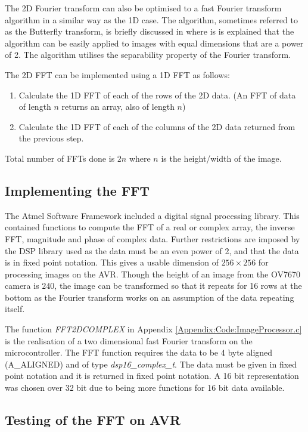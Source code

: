 The 2D Fourier transform can also be optimised to a fast Fourier transform algorithm in a similar way as the 1D case. The algorithm, sometimes referred to as the Butterfly transform, is briefly discussed in \cite{nixon2012feature} where is is explained that the algorithm can be easily applied to images with equal dimensions that are a power of 2. The algorithm utilises the separability property of the Fourier transform. 

The 2D FFT can be implemented using a 1D FFT as follows:
\begin{enumerate}
\item Calculate the 1D FFT of each of the rows of the 2D data. (An FFT of data of length $n$ returns an array, also of length $n$)
\item Calculate the 1D FFT of each of the columns of the 2D data returned from the previous step.
\end{enumerate}
Total number of FFTs done is $2n$ where $n$ is the height/width of the image. 
\subsection{Implementing the FFT}
The Atmel Software Framework \citep{Atmel:ASF} included a digital signal processing library. This contained functions to compute the FFT of a real or complex array, the inverse FFT, magnitude and phase of complex data. Further restrictions are imposed by the DSP library used as the data must be an even power of 2, and that the data is in fixed point notation. This gives a usable dimension of $256 \times 256$ for processing images on the AVR. Though the height of an image from the OV7670 camera is $240$, the image can be transformed so that it repeats for 16 rows at the bottom as the Fourier transform works on an assumption of the data repeating itself.

The function \textit{FFT2DCOMPLEX} in Appendix \ref{Appendix:Code:ImageProcessor.c} is the realisation of a two dimensional fast Fourier transform on the microcontroller. The FFT function requires the data to be 4 byte aligned (A\_ALIGNED) and of type \textit{dsp16\_complex\_t}. The data must be given in fixed point notation and it is returned in fixed point notation. A 16 bit representation was chosen over 32 bit due to being more functions for 16 bit data available. 


\subsection{Testing of the FFT on AVR}
